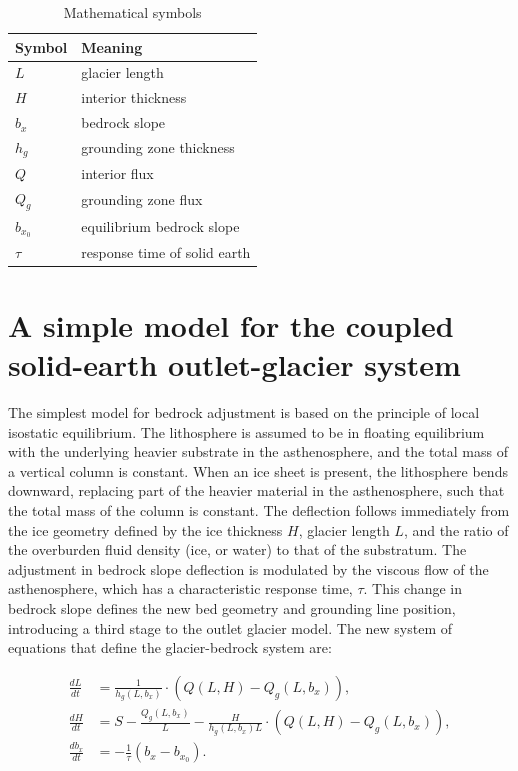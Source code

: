\documentclass[tc, manuscript]{copernicus}
\begin{document}
\begin{table}[h]
    \begin{tabular}{l|l}
        Symbol & Meaning \\
        \hline
        $L$ & glacier length \\
        $H$ & interior thickness \\
        $b_x$ & bedrock slope \\
        $h_g$ & grounding zone thickness \\
        $Q$ & interior flux \\
        $Q_g$ & grounding zone flux \\
        $b_{x_0}$ & equilibrium bedrock slope \\
        $\tau$ & response time of solid earth  \\
    \end{tabular}
    \caption{Mathematical symbols}
\end{table}


\section{A simple model for the coupled solid-earth outlet-glacier system}

The simplest model for bedrock adjustment is based on the principle of local isostatic equilibrium. The lithosphere is assumed to be in floating equilibrium with the underlying heavier substrate in the asthenosphere, and the total mass of a vertical column is constant.
When an ice sheet is present, the lithosphere bends downward, replacing part of the heavier material in the asthenosphere, such that the total mass of the column is constant. The deflection follows immediately from the ice geometry defined by the ice thickness $H$, glacier length $L$, and the ratio of the overburden fluid density (ice, or water) to that of the substratum.
The adjustment in bedrock slope deflection is modulated by the viscous flow of the asthenosphere, which has a characteristic response time, $\tau$.
This change in bedrock slope defines the new bed geometry and grounding line position, introducing a third stage to the outlet glacier model.
The new system of equations that define the glacier-bedrock system are: 
		

\begin{align}
    \frac{dL}{dt} & = \frac{1}{h_g(L,b_x)}\cdot(Q(L,H)-Q_g(L,b_x)), \\
    \frac{dH}{dt} & = S-\frac{Q_g(L,b_x)}{L}-\frac{H}{h_g(L,b_x) L} \cdot (Q(L,H)-Q_g(L,b_x)), \\
    \frac{db_x}{dt} & = -\frac{1}{\tau}(b_x - b_{x_0}).
\end{align}
\end{document}
